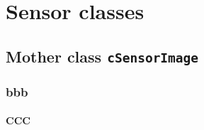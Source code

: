 

\chapter{Sensor classes}



\section{Mother class {\tt cSensorImage}}


\subsection{bbb}

\subsubsection{CCC}



